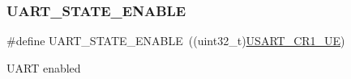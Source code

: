 \subsubsection{\texorpdfstring{U\+A\+R\+T\+\_\+\+S\+T\+A\+T\+E\+\_\+\+E\+N\+A\+B\+LE}{UART\_STATE\_ENABLE}}
{\footnotesize\ttfamily \#define U\+A\+R\+T\+\_\+\+S\+T\+A\+T\+E\+\_\+\+E\+N\+A\+B\+LE~((uint32\+\_\+t)\hyperlink{group___peripheral___registers___bits___definition_ga2bb650676aaae4a5203f372d497d5947}{U\+S\+A\+R\+T\+\_\+\+C\+R1\+\_\+\+UE})}

U\+A\+RT enabled 